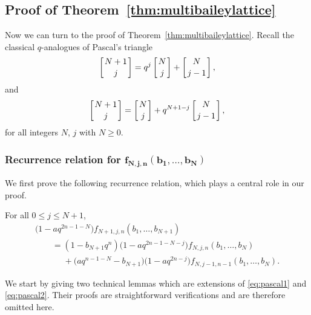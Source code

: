 \subsection[Proof of Theorem~\ref{thm:multibaileylattice}]{Proof of Theorem~\ref{thm:multibaileylattice}}

Now we can turn to the proof of Theorem~\ref{thm:multibaileylattice}.
Recall the classical $q$-analogues of Pascal's triangle
\begin{equation}\label{eq:pascal1}
\left[{N+1\atop j}\right] = q^j\left[{N\atop j}\right]+\left[{N\atop j-1}\right],
\end{equation}
and
\begin{equation} \label{eq:pascal2}
\left[{N+1\atop j}\right]=\left[{N\atop j}\right]+ q^{N+1-j}\left[{N\atop j-1}\right],
\end{equation}
for all integers $N$, $j$ with $N\geq 0$.

\subsubsection[Recurrence relation for f\_\{N,j,n\}(b\_1,...,b\_N)]{Recurrence relation for $\boldsymbol{f_{N,j,n}(b_1,\ldots,b_N)}$}
We first prove the following recurrence relation, which plays a central role in our proof.
\begin{Proposition}\label{prop:rec} For all $0\leq j\leq N+1$,
\begin{gather*}
\bigl(1-aq^{2n-1-N}\bigr)f_{N+1,j,n}(b_1,\ldots,b_{N+1})\\
\qquad =(1-b_{N+1}q^n)\bigl(1-aq^{2n-1-N-j}\bigr)f_{N,j,n}(b_1,\ldots,b_N)\\
\phantom{\qquad =}{}+\bigl(aq^{n-1-N}-b_{N+1}\bigr)\bigl(1-aq^{2n-j}\bigr)f_{N,j-1,n-1}(b_1,\ldots,b_N).
\end{gather*}
\end{Proposition}

We start by giving two technical lemmas which are extensions of \eqref{eq:pascal1} and \eqref{eq:pascal2}. Their proofs are straightforward verifications and are therefore omitted here.


